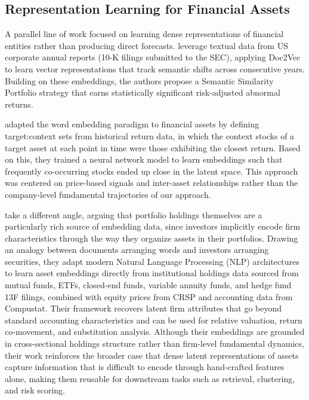 \documentclass[a4paper,fleqn]{cas-dc}
\begin{document}
\subsection{Representation Learning for Financial Assets}

A parallel line of work focused on learning dense representations of financial entities rather than producing direct forecasts. 
\cite{adosoglou_neural_2021} leverage textual data from US corporate annual reports (10-K filings submitted to the SEC), applying Doc2Vec to learn vector representations that track semantic shifts across consecutive years. Building on these embeddings, the authors propose a Semantic Similarity Portfolio strategy that earns statistically significant risk-adjusted abnormal returns.

\citet{stock_embedding_2022} adapted the word embedding paradigm to financial assets by defining target:context sets from historical return data, in which the context stocks of a target asset at each point in time were those exhibiting the closest return. Based on this, they trained a neural network model to learn embeddings such that frequently co-occurring stocks ended up close in the latent space. This approach was centered on price-based signals and inter-asset relationships rather than the company-level fundamental trajectories of our approach.

\citet{gabaix_asset_2025} take a different angle, arguing that portfolio holdings themselves are a particularly rich source of embedding data, since investors implicitly encode firm characteristics through the way they organize assets in their portfolios. Drawing an analogy between documents arranging words and investors arranging securities, they adapt modern Natural Language Processing (NLP) architectures to learn asset embeddings directly from institutional holdings data sourced from mutual funds, ETFs, closed-end funds, variable annuity funds, and hedge fund 13F filings, combined with equity prices from CRSP and accounting data from Compustat. Their framework recovers latent firm attributes that go beyond standard accounting characteristics and can be used for relative valuation, return co-movement, and substitution analysis. Although their embeddings are grounded in cross-sectional holdings structure rather than firm-level fundamental dynamics, their work reinforces the broader case that dense latent representations of assets capture information that is difficult to encode through hand-crafted features alone, making them reusable for downstream tasks such as retrieval, clustering, and risk scoring.
\end{document}

